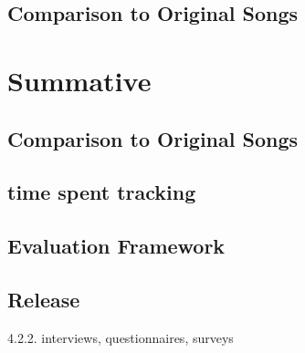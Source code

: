 \subsection{Comparison to Original Songs}
\section{Summative}
\subsection{Comparison to Original Songs}
\subsection{time spent tracking}
\subsection{Evaluation Framework}
\subsection{Release}
4.2.2. interviews, questionnaires, surveys
